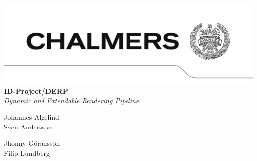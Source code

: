 \begin{titlepage}
\hspace*{-126pt}
\setlength{\voffset}{-129pt}
\enlargethispage{200pt}
\includegraphics[width=\paperwidth,keepaspectratio=true]{img/avancez.png}
\vspace*{130pt}\\
{\Huge\textbf{ID-Project/DERP}}
\vspace*{50pt}\\
\textit{Dynamic and Extendable Rendering Pipeline}
\vspace*{30pt}\\
\begin{minipage}{0.4\textwidth}
\begin{flushleft}
Johannes Algelind\\
Sven Andersson\\
\end{flushleft}
\end{minipage}
\begin{minipage}{0.4\textwidth}
\begin{flushleft}
Jhonny Göransson\\
Filip Lundborg\\
\end{flushleft}
\end{minipage}\\
\vspace*{110pt}\\
\end{titlepage}


